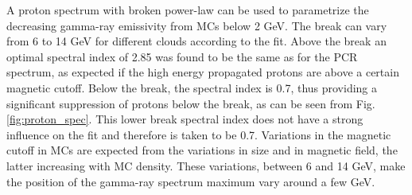 A proton spectrum with broken power-law can be used to parametrize the decreasing gamma-ray emissivity from MCs below 2 GeV. The break can vary from 6 to 14 GeV for different clouds according to the fit. Above the break an optimal spectral index of 2.85 was found to be the same as for the PCR spectrum, as expected if the high energy propagated protons are above a certain magnetic cutoff. Below the break, the spectral index is 0.7, thus providing a significant suppression of protons below the break, as can be seen from Fig. \ref{fig:proton_spec}. This lower break spectral index does not have a strong influence on the fit and therefore is taken to be 0.7.
Variations in the magnetic cutoff in MCs are expected from the variations in size and in magnetic field, the latter increasing with MC density.  
These variations, between 6 and 14 GeV, make the position of the gamma-ray spectrum maximum vary around a few GeV.

